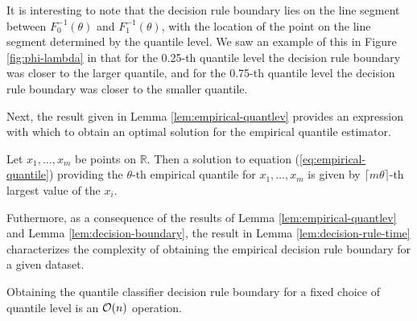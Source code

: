It is interesting to note that the decision rule boundary lies on the line
segment between $F_0^{-1}(\theta)$ and $F_1^{-1}(\theta)$, with the location of
the point on the line segment determined by the quantile level.  We saw an
example of this in Figure \ref{fig:phi-lambda} in that for the 0.25-th quantile
level the decision rule boundary was closer to the larger quantile, and for the
0.75-th quantile level the decision rule boundary was closer to the smaller
quantile.

Next, the result given in Lemma \ref{lem:empirical-quantlev} provides an
expression with which to obtain an optimal solution for the empirical quantile
estimator.  

\begin{lemma}
  \label{lem:empirical-quantlev}
  Let $x_1, \dots, x_m$ be points on $\mathbb{R}$.  Then a solution to equation
  (\ref{eq:empirical-quantile}) providing the $\theta$-th empirical quantile for
  $x_1, \dots, x_m$ is given by $\lceil m \theta \rceil$-th largest value of the
  $x_i$.
\end{lemma}


Futhermore, as a consequence of the results of Lemma
\ref{lem:empirical-quantlev} and Lemma \ref{lem:decision-boundary}, the result
in Lemma \ref{lem:decision-rule-time} characterizes the complexity of obtaining
the empirical decision rule boundary for a given dataset.

\begin{lemma}
  \label{lem:decision-rule-time}
  Obtaining the quantile classifier decision rule boundary for a fixed choice of
  quantile level is an $\mathcal{O}(n)$ operation.
\end{lemma}





